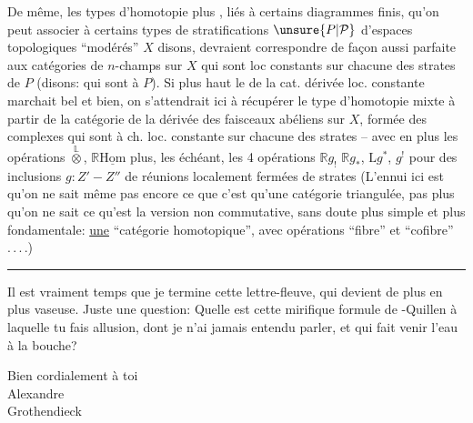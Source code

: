 De même, les types d'homotopie plus , liés à certains diagrammes finis, qu'on peut associer à certains types de stratifications $\unsure{P|\mathcal{P}}$ d'espaces topologiques ``modérés'' $X$ disons, devraient correspondre de façon aussi parfaite aux catégories de $n$-champs sur $X$ qui sont loc constants sur chacune des strates de $P$ (disons: qui sont  à $P$). Si plus haut le  de la cat. dérivée loc. constante marchait bel et bien, on s'attendrait ici à récupérer le type d'homotopie mixte à partir de la catégorie de la  dérivée des faisceaux abéliens sur $X$, formée des complexes qui sont à ch. loc. constante sur chacune des strates -- avec en plus les opérations $\overset{\mathbb{L}}{\otimes}$, $\mathbb{R}\underline{\mathrm{Hom}}$ plus, les
 échéant, les 4 opérations $\mathbb{R}g_!$ $\mathbb{R}g_*$, $\mathrm{L}g^*$, $g^!$ pour des inclusions $g:Z'-Z''$ de réunions localement fermées de strates (L'ennui ici est qu'on ne sait même pas encore ce que c'est qu'une catégorie triangulée, pas plus qu'on ne sait ce qu'est la version non commutative, sans doute plus simple et plus fondamentale: \uline{une} ``catégorie homotopique'', avec opérations ``fibre'' et ``cofibre'' .\,.\,.\,.)

\begin{center}\rule{0.41\linewidth}{0.4pt}\end{center}

Il est vraiment temps que je termine cette lettre-fleuve, qui devient de plus en plus vaseuse. Juste une question: Quelle est cette mirifique formule de -Quillen à laquelle tu fais allusion, dont je n'ai jamais entendu parler, et qui fait venir l'eau à la bouche?

Bien cordialement à toi\\
\hspace*{0.42\linewidth}Alexandre\\
\hspace*{0.52\linewidth}Grothendieck\\
